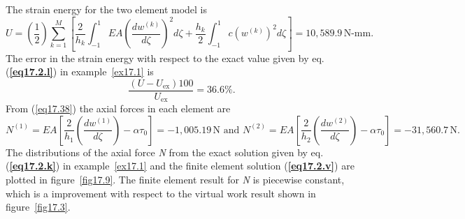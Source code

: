\documentclass{AeroStructure-ERJohnson}
\begin{document}
\begin{example}
{\def\thefigure{17.8}
}

{\def\thefigure{17.9}
}

The strain energy for the two element model is
\begin{equation}
U=\left(\frac{1}{2}\right) \sum_{k=1}^{M}\left[\frac{2}{h_{k}} \int_{-1}^{1} E A\left(\frac{d w^{(k)}}{d \zeta}\right)^{2} d \zeta+\frac{h_{k}}{2} \int_{-1}^{1} c\left(w^{(k)}\right)^{2} d \zeta\right]=10,589.9\,\textrm{N-mm}. \label{eq17.2.t}\tag{t}
\end{equation}
The error in the strain energy with respect to the exact value given by eq. (\textbf{\ref{eq17.2.l}}) in example~\ref{ex17.1} is
\begin{equation}
\frac{\left(U-U_{\mathrm{ex}}\right) 100}{U_{\mathrm{ex}}}=36.6 \%. \label{eq17.2.u}\tag{u}
\end{equation}
From (\ref{eq17.38}) the axial forces in each element are
\begin{equation}
N^{(1)}=E A\left[\frac{2}{h_{1}}\left(\frac{d w^{(1)}}{d \zeta}\right)-\alpha \tau_{0}\right]=-1,005.19\,\mathrm{N} \textrm{ and } N^{(2)}=E A\left[\frac{2}{h_{2}}\left(\frac{d w^{(2)}}{d \zeta}\right)-\alpha \tau_{0}\right]=-31,560.7\,\mathrm{N}. \label{eq17.2.v}\tag{v}
\end{equation}
The distributions of the axial force \textit{N} from the exact solution given by eq. (\textbf{\ref{eq17.2.k}}) in example~\ref{ex17.1} and the finite element solution (\textbf{\ref{eq17.2.v}}) are plotted in figure~\ref{fig17.9}. The finite element result for \textit{N} is piecewise constant, which is a improvement with respect to the virtual work result shown in figure~\ref{fig17.3}.
\end{example}
\end{document}
